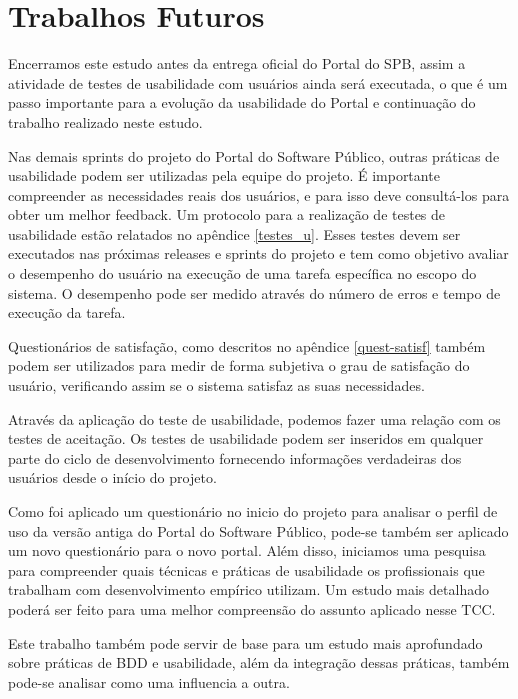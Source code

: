 \section{Trabalhos Futuros}

Encerramos este estudo antes da entrega oficial do Portal do SPB, assim a atividade de testes de usabilidade com usuários ainda será executada, o que é um passo importante para a evolução da usabilidade do Portal e continuação do trabalho realizado neste estudo.


Nas demais sprints do projeto do Portal do Software Público, outras práticas de usabilidade podem ser utilizadas pela equipe do projeto. É importante compreender as necessidades reais dos usuários, e para isso deve consultá-los para obter um melhor feedback. Um protocolo para a realização de testes de usabilidade estão relatados no apêndice \ref{testes_u}.
%
Esses testes devem ser executados nas próximas releases e sprints do projeto e tem como objetivo avaliar o desempenho do usuário na execução de uma tarefa específica no escopo do sistema. O desempenho pode ser medido através do número de erros e tempo de execução da tarefa. 

Questionários de satisfação, como descritos no apêndice \ref{quest-satisf} também podem ser utilizados para medir de forma subjetiva o grau de satisfação do usuário, verificando assim se o sistema satisfaz as suas necessidades.

Através da aplicação do teste de usabilidade, podemos fazer uma relação com os testes de aceitação. Os testes de usabilidade podem ser inseridos em qualquer parte do ciclo de desenvolvimento fornecendo informações verdadeiras dos usuários desde o início do projeto.

Como foi aplicado um questionário no inicio do projeto para analisar o perfil de uso da versão antiga do Portal do Software Público, pode-se também ser aplicado um novo questionário para o novo portal.
%
Além disso, iniciamos uma pesquisa para compreender quais técnicas e práticas de usabilidade os profissionais que trabalham com desenvolvimento empírico utilizam. Um estudo mais detalhado poderá ser feito para uma melhor compreensão do assunto aplicado nesse TCC. 

Este trabalho também pode servir de base para um estudo mais aprofundado sobre práticas de BDD e usabilidade, além da integração dessas práticas, também pode-se analisar como uma influencia a outra.
